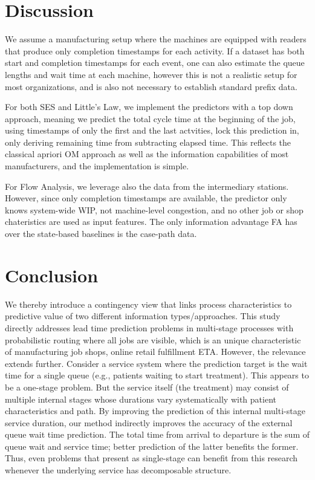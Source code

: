 \documentclass[
]{ceurart}
\begin{document}
\section{Discussion}

We assume a manufacturing setup where the machines are equipped with readers that produce only completion timestamps for each activity. If a dataset has both start and completion 
timestamps for each event, one can also estimate the queue lengths and wait time at each machine, however this is not a realistic setup for most organizations, and is also not necessary to establish standard prefix data.

For both SES and Little's Law, we implement the predictors with a top down approach, meaning we predict the total cycle time at the beginning of the job, 
using timestamps of only the first and the last actvities, lock this prediction in, only deriving remaining time from subtracting elapsed time. This reflects the classical apriori OM approach as well as the information 
capabilities of most manufacturers, and the implementation is simple.

For Flow Analysis, we leverage also the data from the intermediary stations. However, since only completion timestamps are available, the predictor only knows system-wide WIP, not machine-level congestion, and no other job 
or shop chateristics are used as input features. The only information advantage FA has over the state-based baselines is the case-path data.

\section{Conclusion}

We thereby introduce a contingency view that links process characteristics to predictive value of two different information types/approaches.
This study directly addresses lead time prediction problems in multi-stage processes with probabilistic routing where all jobs are visible, which is an unique characteristic of manufacturing job shops, online retail fulfillment ETA. 
However, the relevance extends further. Consider a service system where the prediction target is the wait time for a single queue 
(e.g., patients waiting to start treatment). This appears to be a one-stage problem. But the service itself (the treatment) may consist 
of multiple internal stages whose durations vary systematically with patient characteristics and path. By improving the prediction of this 
internal multi-stage service duration, our method indirectly improves the accuracy of the external queue wait time prediction. 
The total time from arrival to departure is the sum of queue wait and service time; better prediction of the latter benefits the former. Thus, even problems that present as single-stage can benefit from this research whenever the underlying service has decomposable structure.
\end{document}
